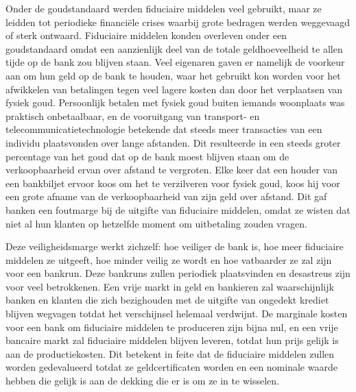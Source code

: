 \documentclass[
  a5paper,
  smalldemyvopaper,11pt,twoside,onecolumn,openright,extrafontsizes,
hidelinks]{memoir}
\begin{document}
Onder de goudstandaard werden fiduciaire middelen veel gebruikt, maar ze
leidden tot periodieke financiële crises waarbij grote bedragen werden
weggevaagd of sterk ontwaard. Fiduciaire middelen konden overleven onder
een goudstandaard omdat een aanzienlijk deel van de totale
geldhoeveelheid te allen tijde op de bank zou blijven staan. Veel
eigenaren gaven er namelijk de voorkeur aan om hun geld op de bank te
houden, waar het gebruikt kon worden voor het afwikkelen van betalingen
tegen veel lagere kosten dan door het verplaatsen van fysiek goud.
Persoonlijk betalen met fysiek goud buiten iemands woonplaats was
praktisch onbetaalbaar, en de vooruitgang van transport- en
telecommunicatietechnologie betekende dat steeds meer transacties van
een individu plaatsvonden over lange afstanden. Dit resulteerde in een
steeds groter percentage van het goud dat op de bank moest blijven staan
om de verkoopbaarheid ervan over afstand te vergroten. Elke keer dat een
houder van een bankbiljet ervoor koos om het te verzilveren voor fysiek
goud, koos hij voor een grote afname van de verkoopbaarheid van zijn
geld over afstand. Dit gaf banken een foutmarge bij de uitgifte van
fiduciaire middelen, omdat ze wisten dat niet al hun klanten op
hetzelfde moment om uitbetaling zouden vragen.

Deze veiligheidsmarge werkt zichzelf: hoe veiliger de bank is, hoe meer
fiduciaire middelen ze uitgeeft, hoe minder veilig ze wordt en hoe
vatbaarder ze zal zijn voor een bankrun. Deze bankruns zullen periodiek
plaatsvinden en desastreus zijn voor veel betrokkenen. Een vrije markt
in geld en bankieren zal waarschijnlijk banken en klanten die zich
bezighouden met de uitgifte van ongedekt krediet blijven wegvagen totdat
het verschijnsel helemaal verdwijnt. De marginale kosten voor een bank
om fiduciaire middelen te produceren zijn bijna nul, en een vrije
bancaire markt zal fiduciaire middelen blijven leveren, totdat hun prijs
gelijk is aan de productiekosten. Dit betekent in feite dat de
fiduciaire middelen zullen worden gedevalueerd totdat ze
geldcertificaten worden en een nominale waarde hebben die gelijk is aan
de dekking die er is om ze in te wisselen.
\end{document}
